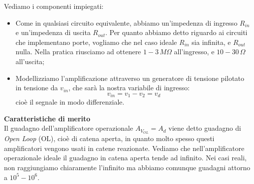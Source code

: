 \documentclass[a4paper,11pt]{article}
\begin{document}
\begin{center}
\end{center}

Vediamo i componenti impiegati:
\begin{itemize}
	\item Come in qualsiasi circuito equivalente, abbiamo un'impedenza di ingresso $R_{in}$ e un'impedenza di uscita $R_{out}$. Per quanto abbiamo detto riguardo ai circuiti che implementano porte, vogliamo che nel caso ideale $R_{in}$ sia infinita, e $R_{out}$ nulla. Nella pratica riusciamo ad ottenere $1 - 3 \, M\Omega$ all'ingresso, e $10 - 30 \, \Omega$ all'uscita;
	\item Modellizziamo l'amplificazione attraverso un generatore di tensione pilotato in tensione da $v_{in}$, che sarà la nostra variabile di ingresso:
	$$
	v_{in} = v_1 - v_2 = v_d
	$$
	cioè il segnale in modo differenziale.
\end{itemize}

\par\smallskip

\noindent
\textbf{\textsf{Caratteristiche di merito}} \\
\noindent
Il guadagno dell'amplificatore operazionale $A_{V_{OL}} = A_d$ viene detto guadagno di \textit{Open Loop} (OL), cioè di catena aperta, in quanto molto spesso questi amplificatori vengono usati in catene reazionate. Vediamo che nell'amplificatore operazionale ideale il guadagno in catena aperta tende ad infinito. Nei casi reali, non raggiungiamo chiaramente l'infinito ma abbiamo comunque guadagni attorno a $10^5 - 10^6$.
\end{document}
